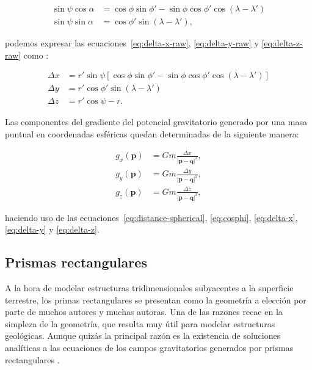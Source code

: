 \begin{align}
    \sin\psi \cos\alpha &=
        \cos\phi \sin\phi' - \sin\phi \cos\phi' \cos(\lambda - \lambda') \\
    \sin\psi \sin\alpha &=
        \cos\phi' \sin(\lambda - \lambda'),
\end{align}

\noindent podemos expresar las ecuaciones~\ref{eq:delta-x-raw},
\ref{eq:delta-y-raw} y \ref{eq:delta-z-raw} como \citep{grombein2013}:

\begin{align}
    \Delta x &= r' \sin\psi \left[
        \cos\phi \sin\phi' - \sin\phi \cos\phi' \cos(\lambda - \lambda')
        \right]
    \label{eq:delta-x}
    \\
    \Delta y &= r' \cos\phi' \sin(\lambda - \lambda')
    \label{eq:delta-y}
    \\
    \Delta z &= r'\cos\psi - r.
    \label{eq:delta-z}
\end{align}

Las componentes del gradiente del potencial gravitatorio generado por una masa
puntual en coordenadas esféricas quedan determinadas de la siguiente manera:

\begin{align}
    g_x(\mathbf{p}) &=
        G m
        \frac{\Delta x}{|\mathbf{p} - \mathbf{q}|^3},
    \label{eq:gx-particula-spherical}
    \\
    g_y(\mathbf{p}) &=
        G m
        \frac{\Delta y}{|\mathbf{p} - \mathbf{q}|^3},
    \label{eq:gy-particula-spherical}
    \\
    g_z(\mathbf{p}) &=
        G m
        \frac{\Delta z}{|\mathbf{p} - \mathbf{q}|^3},
    \label{eq:gz-particula-spherical}
\end{align}

\noindent haciendo uso de las ecuaciones~\ref{eq:distance-spherical},
\ref{eq:cosphi}, \ref{eq:delta-x}, \ref{eq:delta-y} y \ref{eq:delta-z}.


\subsection{Prismas rectangulares}
\label{sec:prismas-rectangulares}

A la hora de modelar estructuras tridimensionales subyacentes a la superficie
terrestre, los primas rectangulares se presentan como la geometría a elección
por parte de muchos autores y muchas autoras.
Una de las razones recae en la simpleza de la geometría, que resulta muy útil
para modelar estructuras geológicas.
Aunque quizás la principal razón es la existencia de soluciones analíticas
a las ecuaciones de los campos gravitatorios generados por prismas
rectangulares \citep{nagy2000,nagy2002}.

